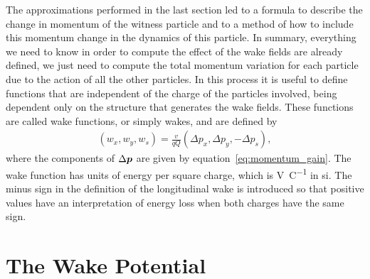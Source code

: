     The approximations performed in the last section led to a formula to describe the change in momentum of the witness particle and to a method of how to include this momentum change in the dynamics of this particle. In summary, everything we need to know in order to compute the effect of the wake fields are already defined, we just need to compute the total momentum variation for each particle due to the action of all the other particles. In this process it is useful to define functions that are independent of the charge of the particles involved, being dependent only on the structure that generates the wake fields. These functions are called wake functions, or simply wakes, and are defined by
    \begin{align}\label{eq:wake_definition}
	  	\left(w_x, w_y, w_s\right) =
	  	\frac{v}{qQ} \left(\Delta p_x, \Delta p_y, -\Delta p_s\right),
    \end{align}
    where the components of $\Delta\boldsymbol{p}$ are given by equation~\eqref{eq:momentum_gain}. The wake function has units of energy per square charge, which is \si{\volt\per\coulomb} in \gls{si}. The minus sign in the definition of the longitudinal wake is introduced so that positive values have an interpretation of energy loss when both charges have the same sign.

\section{The Wake Potential}

